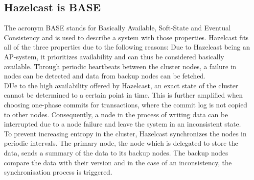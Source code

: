 \subsection{Hazelcast is BASE}
The acronym BASE stands for Basically Available, Soft-State and Eventual Consistency and is used to describe a system with those properties. Hazelcast fits all of the three properties due to the following reasons:
Due to Hazelcast being an AP-system, it prioritizes availability and can thus be considered basically available. Through periodic heartbeats between the cluster nodes, a failure in nodes can be detected and data from backup nodes can be fetched.\\
DUe to the high availability offered by Hazelcast, an exact state of the cluster cannot be determined to a certain point in time. This is further amplified when choosing one-phase commits for transactions, where the commit log is not copied to other nodes. Consequently, a node in the process of writing data can be interrupted due to a node failure and leave the system in an inconsistent state.\\
To prevent increasing entropy in the cluster, Hazelcast synchronizes the nodes in periodic intervals. The primary node, the node which is delegated to store the data, sends a summary of the data to its backup nodes. The backup nodes compare the data with their version and in the case of an inconsistency, the synchronisation process is triggered. 